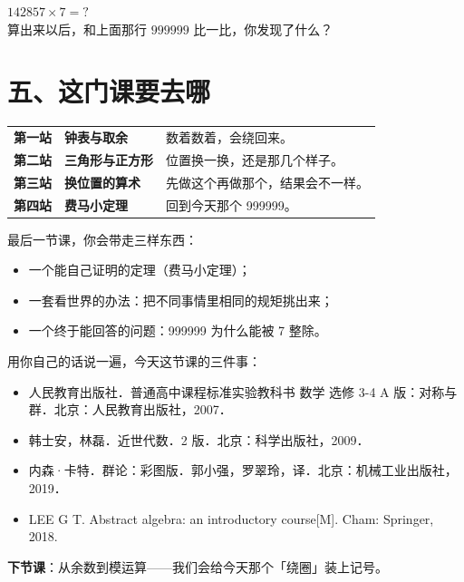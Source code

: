 \begin{dongshou}[自己动手算一算]
  \(142857 \times 7 = ?\)\\[6pt]
  算出来以后，和上面那行 \(999999\) 比一比，你发现了什么？
\end{dongshou}

\section*{五、这门课要去哪}

\begin{center}
\begin{tabular}{@{}>{\raggedright\arraybackslash}p{5.4cm}>{\raggedright\arraybackslash}p{8.4cm}@{}}
\toprule
\textbf{第一站　钟表与取余} & 数着数着，会绕回来。 \\
\textbf{第二站　三角形与正方形} & 位置换一换，还是那几个样子。 \\
\textbf{第三站　换位置的算术} & 先做这个再做那个，结果会不一样。 \\
\textbf{第四站　费马小定理} & 回到今天那个 999999。 \\
\bottomrule
\end{tabular}
\end{center}

最后一节课，你会带走三样东西：

\begin{itemize}
  \item 一个能自己证明的定理（费马小定理）；
  \item 一套看世界的办法：把不同事情里相同的规矩挑出来；
  \item 一个终于能回答的问题：999999 为什么能被 7 整除。
\end{itemize}

\begin{xiaojie}
  用你自己的话说一遍，今天这节课的三件事：
\end{xiaojie}


\begin{itemize}
  \item 人民教育出版社．普通高中课程标准实验教科书 数学 选修 3-4 A 版：对称与群．北京：人民教育出版社，2007．
  \item 韩士安，林磊．近世代数．2 版．北京：科学出版社，2009．
  \item 内森·卡特．群论：彩图版．郭小强，罗翠玲，译．北京：机械工业出版社，2019．
  \item LEE G T. Abstract algebra: an introductory course[M]. Cham: Springer, 2018.
\end{itemize}

\noindent\textbf{下节课}：从余数到模运算——我们会给今天那个「绕圈」装上记号。